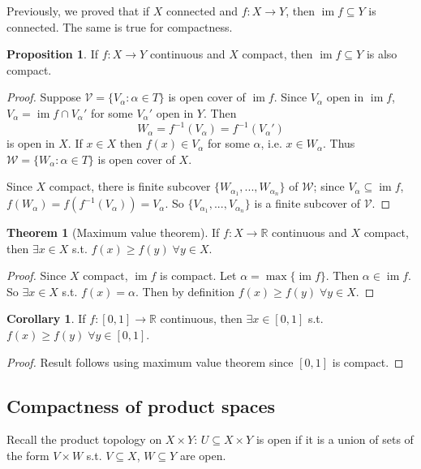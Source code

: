 \documentclass[a4paper,11pt]{article}
\theoremstyle{definition}
\newtheorem*{prop}{Proposition}
\newtheorem*{thm}{Theorem}
\newtheorem*{cor}{Corollary}
\DeclareMathOperator{\im}{im}
\numberwithin{equation}{section}
\begin{document}
Previously, we proved that if $X$ connected and $f:X \rightarrow Y$, then $\im f\subseteq Y$ is connected. The same is true for compactness.
\begin{prop}
    If $f:X\rightarrow Y$ continuous and $X$ compact, then $\im f\subseteq Y$ is also compact.
\end{prop}

\begin{proof}
    Suppose $\mathcal{V}=\{V_\alpha:\alpha\in T\}$ is open cover of $\im f$. Since $V_\alpha$ open in $\im f$, $V_\alpha=\im f\cap V_\alpha'$ for some $V_\alpha'$ open in $Y$. Then
    \begin{equation}
        W_\alpha=f^{-1}(V_\alpha)=f^{-1}(V_\alpha')
    \end{equation}
    is open in $X$. If $x\in X$ then $f(x)\in V_\alpha$ for some $\alpha$, i.e. $x\in W_\alpha$. Thus $\mathcal{W}=\{W_\alpha:\alpha\in T\}$ is open cover of $X$.
    
    Since $X$ compact, there is finite subcover $\{W_{\alpha_1},...,W_{\alpha_n}\}$ of $\mathcal{W}$; since $V_\alpha\subseteq\im f$, $f(W_\alpha)=f(f^{-1}(V_\alpha))=V_\alpha$. So $\{V_{\alpha_1},...,V_{\alpha_n}\}$ is a finite subcover of $\mathcal{V}$.
\end{proof}

\begin{thm}[Maximum value theorem]
If $f:X\rightarrow\mathbb{R}$ continuous and $X$ compact, then $\exists x\in X$ s.t. $f(x)\geq f(y)\;\forall y\in X$.
\end{thm}

\begin{proof}
    Since $X$ compact, $\im f$ is compact. Let $\alpha=\max\{\im f\}$. Then $\alpha\in\im f$. So $\exists x\in X$ s.t. $f(x)=\alpha$. Then by definition $f(x)\geq f(y)\;\forall y\in X$.
\end{proof}

\begin{cor}
If $f:[0,1]\rightarrow\mathbb{R}$ continuous, then $\exists x\in[0,1]$ s.t. $f(x)\geq f(y)\;\forall y\in[0,1]$.
\end{cor}

\begin{proof}
    Result follows using maximum value theorem since $[0,1]$ is compact.
\end{proof}

\subsection{Compactness of product spaces}
Recall the product topology on $X\times Y$: $U\subseteq X\times Y$ is open if it is a union of sets of the form $V\times W$ s.t. $V\subseteq X$, $W\subseteq Y$ are open.
\end{document}
